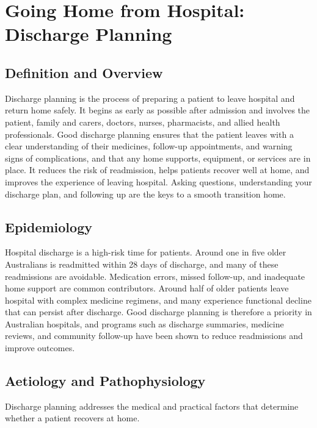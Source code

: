 \chapter{Going Home from Hospital: Discharge Planning}

\section*{Definition and Overview}
Discharge planning is the process of preparing a patient to leave hospital and return home safely. It begins as early as possible after admission and involves the patient, family and carers, doctors, nurses, pharmacists, and allied health professionals. Good discharge planning ensures that the patient leaves with a clear understanding of their medicines, follow-up appointments, and warning signs of complications, and that any home supports, equipment, or services are in place. It reduces the risk of readmission, helps patients recover well at home, and improves the experience of leaving hospital. Asking questions, understanding your discharge plan, and following up are the keys to a smooth transition home.

\section*{Epidemiology}
Hospital discharge is a high-risk time for patients. Around one in five older Australians is readmitted within 28 days of discharge, and many of these readmissions are avoidable. Medication errors, missed follow-up, and inadequate home support are common contributors. Around half of older patients leave hospital with complex medicine regimens, and many experience functional decline that can persist after discharge. Good discharge planning is therefore a priority in Australian hospitals, and programs such as discharge summaries, medicine reviews, and community follow-up have been shown to reduce readmissions and improve outcomes.

\section*{Aetiology and Pathophysiology}
Discharge planning addresses the medical and practical factors that determine whether a patient recovers at home.

